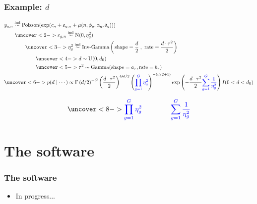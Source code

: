 \documentclass[handout]{beamer}
\providecommand{\e}{\varepsilon}
\numberwithin{equation}{section}
\begin{document}
\begin{frame}
\frametitle{Example: $d$} \tiny
\begin{align*}
&y_{g,n} \stackrel{\text{ind}}{\sim} \text{Poisson}( \exp(c_n + \e_{g, n} + \mu(n, \phi_g, \alpha_g, \delta_g))) \\
& \qquad \uncover<2->{ \e_{g, n} \stackrel{\text{ind}}{\sim} \text{N}( 0, \eta_g^2)} \\
& \qquad \qquad \uncover<3->{\eta_g^2 \stackrel{\text{ind}}{\sim} \text{Inv-Gamma}\left (\left . \text{shape} = \frac{d}{2} \right ., \ \text{rate} =  \frac{d \cdot \tau^2}{2} \right)} \\
& \qquad \qquad \qquad \uncover<4->{d \stackrel{\text{}}{\sim} \text{U}( 0, d_0)} \\
& \qquad \qquad \qquad \uncover<5->{\tau^2 \stackrel{\text{}}{\sim} \text{Gamma}(\text{shape} = a_\tau, \text{rate} = b_\tau)} \\
&\uncover<6->{p(d \mid \cdots) \propto \Gamma \left( d/2 \right )^{-G} \left ( \frac{d \cdot \tau^2}{2}\right ) ^ { G d  /2 } \left ({\color{blue} \prod_{g = 1}^G { \eta_g^2} } \right )^{ -(d/2 + 1)} \exp \left (- \frac{d \cdot \tau^2}{2} {\color{blue} \sum_{g = 1}^G \frac{1}{ \eta_g^2} }\right ) I(0 < d < d_0) }
\end{align*}



\small
\begin{itemize}
\begin{align*}
\uncover<8->{\color{blue}\prod_{g = 1}^G \eta_g^2 \qquad \qquad \sum_{g = 1}^G \frac{1}{\eta_g^2} } 
\end{align*}
\end{itemize}
\end{frame}






\section{The software}

\setcounter{subsection}{1}


\begin{frame}
\frametitle{The software}
\begin{itemize}
\item In progress...
\end{itemize}

\end{frame}
\end{document}
